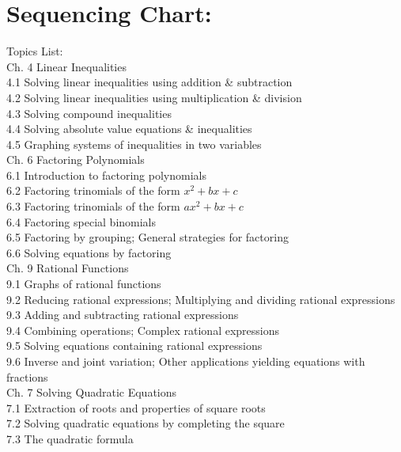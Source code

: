 \documentclass{ximera}
\begin{document}
\section*{Sequencing Chart:}
Topics List:\\
Ch. 4 Linear Inequalities\\
4.1 Solving linear inequalities using addition \& subtraction\\
4.2 Solving linear inequalities using multiplication \& division\\
4.3 Solving compound inequalities\\
4.4 Solving absolute value equations \& inequalities\\
4.5 Graphing systems of inequalities in two variables\\
Ch. 6 Factoring Polynomials\\
6.1 Introduction to factoring polynomials\\
6.2 Factoring trinomials of the form $x^{2}+b x+c$\\
6.3 Factoring trinomials of the form $a x^{2}+b x+c$\\
6.4 Factoring special binomials\\
6.5 Factoring by grouping; General strategies for factoring\\
6.6 Solving equations by factoring\\
Ch. 9 Rational Functions\\
9.1 Graphs of rational functions\\
9.2 Reducing rational expressions; Multiplying and dividing rational expressions\\
9.3 Adding and subtracting rational expressions\\
9.4 Combining operations; Complex rational expressions\\
9.5 Solving equations containing rational expressions\\
9.6 Inverse and joint variation; Other applications yielding equations with fractions\\
Ch. 7 Solving Quadratic Equations\\
7.1 Extraction of roots and properties of square roots\\
7.2 Solving quadratic equations by completing the square\\
7.3 The quadratic formula\\
\end{document}
